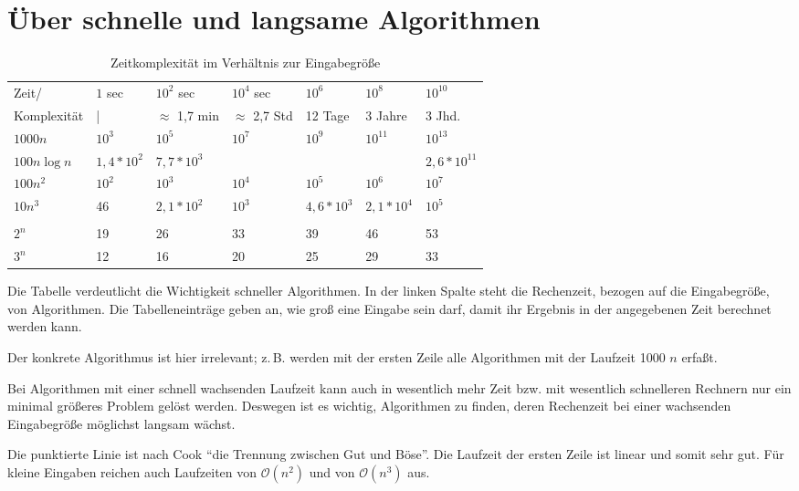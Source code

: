 \documentclass[ngerman,draft,parskip=half*,twoside]{scrreprt}
\theoremstyle{break}
\theoremstyle{nonumberbreak}
\newcommand*{\OO}{\mathcal{O}}      %
\begin{document}
\section{Über schnelle und langsame Algorithmen}
\begin{table}[h]
  \begin{tabular}{*{7}{|l}|}
    \hline
    Zeit/ & $1$ sec & $10^2$ sec & $10^4$ sec & $10^6$ & $10^8$ & $10^{10}$ \\
    Komplexität & | & $\approx$ 1,7 min & $\approx$ 2,7 Std & 12 Tage & 3 Jahre & 3 Jhd.\\
    \hline
    $1000n$ & $10^3$ & $10^5$ & $10^7$ & $10^9$ & $10^{11}$ & $10^{13}$ \\
    $100n\log n$ & $1,4*10^2$ & $7,7*10^3$ & & & & $2,6*10^{11}$ \\
    $100n^2$ & $10^2$ & $10^3$ & $10^4$ & $10^5$ & $10^6$ & $10^7$\\
    $10n^3$ & 46 & $2,1*10^2$ & $10^3$ & $4,6*10^3$ & $2,1*10^4$ & $10^5$ \\
    \\
    $2^n$ & 19 & 26 & 33 & 39 & 46 & 53\\
    $3^n$ & 12 & 16 & 20 & 25 & 29 & 33\\
    \hline
  \end{tabular}
  \caption{Zeitkomplexität im Verhältnis zur Eingabegröße}
\end{table}

Die Tabelle verdeutlicht die Wichtigkeit schneller Algorithmen. 
In der linken Spalte steht die Rechenzeit, bezogen auf die Eingabegröße, von Algorithmen. 
Die Tabelleneinträge geben an, wie groß eine Eingabe sein darf, damit ihr Ergebnis in der angegebenen Zeit berechnet werden kann. 

Der konkrete Algorithmus ist hier irrelevant; z.\,B. werden mit der ersten Zeile alle Algorithmen mit der Laufzeit 1000 $n$ erfaßt. 

Bei Algorithmen mit einer schnell wachsenden Laufzeit kann auch in wesentlich mehr Zeit bzw. mit wesentlich schnelleren Rechnern nur ein
minimal größeres Problem gelöst werden. Deswegen ist es wichtig, Algorithmen zu finden, deren Rechenzeit bei einer wachsenden
Eingabegröße möglichst langsam wächst.

Die punktierte Linie ist nach Cook "`die Trennung zwischen Gut und
Böse"'. Die Laufzeit der ersten Zeile ist linear und somit sehr gut.
Für kleine Eingaben reichen auch Laufzeiten von $\OO(n^2)$ und von $\OO(n^3)$ aus.
\end{document}
